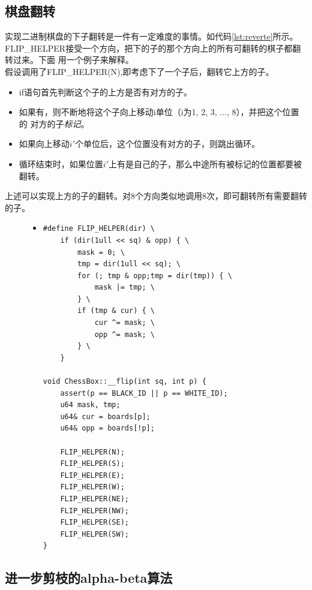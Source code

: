 \documentclass[a4paper]{article}
\begin{document}
\subsection{棋盘翻转}
实现二进制棋盘的下子翻转是一件有一定难度的事情。如代码\autoref{lst:reverte}所示。\\

FLIP\_HELPER接受一个方向，把下的子的那个方向上的所有可翻转的棋子都翻转过来。下面
用一个例子来解释。\\

假设调用了FLIP\_HELPER(N),即考虑下了一个子后，翻转它上方的子。
\begin{itemize}
    \item if语句首先判断这个子的上方是否有对方的子。
    \item 如果有，则不断地将这个子向上移动i单位（i为1, 2, 3, ..., 8），并把这个位置的
对方的子\emph{标记}。
    \item 如果向上移动$i'$个单位后，这个位置没有对方的子，则跳出循环。
    \item 循环结束时，如果位置$i'$上有是自己的子，那么中途所有被标记的位置都要被翻转。
\end{itemize}
上述可以实现上方的子的翻转。对8个方向类似地调用8次，即可翻转所有需要翻转的子。

\begin{figure}[!hbt]
\begin{itemize}
\item[] \begin{lstlisting}[style=mycpp, label=lst:reverte, caption=二进制棋盘的翻转实现]
#define FLIP_HELPER(dir) \
    if (dir(1ull << sq) & opp) { \
        mask = 0; \
        tmp = dir(1ull << sq); \
        for (; tmp & opp;tmp = dir(tmp)) { \
            mask |= tmp; \
        } \
        if (tmp & cur) { \
            cur ^= mask; \
            opp ^= mask; \
        } \
    }

void ChessBox::__flip(int sq, int p) {
    assert(p == BLACK_ID || p == WHITE_ID);
    u64 mask, tmp;
    u64& cur = boards[p];
    u64& opp = boards[!p];

    FLIP_HELPER(N);
    FLIP_HELPER(S);
    FLIP_HELPER(E);
    FLIP_HELPER(W);
    FLIP_HELPER(NE);
    FLIP_HELPER(NW);
    FLIP_HELPER(SE);
    FLIP_HELPER(SW);
}
\end{lstlisting}
\end{itemize}
\end{figure}

\subsection{进一步剪枝的alpha-beta算法}
\end{document}
